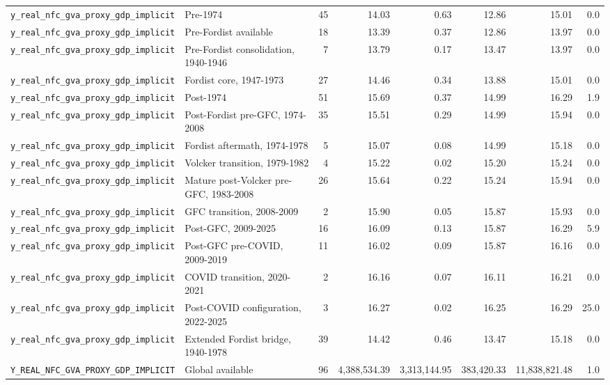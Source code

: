 \begin{landscape}
\begin{longtable}{p{4.4cm}p{3.8cm}rrrrrr}
\\
\nolinkurl{y_real_nfc_gva_proxy_gdp_implicit} & Pre-1974 & 45 & 14.03 & 0.63 & 12.86 & 15.01 & 0.0
\\
\nolinkurl{y_real_nfc_gva_proxy_gdp_implicit} & Pre-Fordist available & 18 & 13.39 & 0.37 & 12.86 & 13.97 & 0.0
\\
\nolinkurl{y_real_nfc_gva_proxy_gdp_implicit} & Pre-Fordist consolidation, 1940-1946 & 7 & 13.79 & 0.17 & 13.47 & 13.97 & 0.0
\\
\nolinkurl{y_real_nfc_gva_proxy_gdp_implicit} & Fordist core, 1947-1973 & 27 & 14.46 & 0.34 & 13.88 & 15.01 & 0.0
\\
\nolinkurl{y_real_nfc_gva_proxy_gdp_implicit} & Post-1974 & 51 & 15.69 & 0.37 & 14.99 & 16.29 & 1.9
\\
\nolinkurl{y_real_nfc_gva_proxy_gdp_implicit} & Post-Fordist pre-GFC, 1974-2008 & 35 & 15.51 & 0.29 & 14.99 & 15.94 & 0.0
\\
\nolinkurl{y_real_nfc_gva_proxy_gdp_implicit} & Fordist aftermath, 1974-1978 & 5 & 15.07 & 0.08 & 14.99 & 15.18 & 0.0
\\
\nolinkurl{y_real_nfc_gva_proxy_gdp_implicit} & Volcker transition, 1979-1982 & 4 & 15.22 & 0.02 & 15.20 & 15.24 & 0.0
\\
\nolinkurl{y_real_nfc_gva_proxy_gdp_implicit} & Mature post-Volcker pre-GFC, 1983-2008 & 26 & 15.64 & 0.22 & 15.24 & 15.94 & 0.0
\\
\nolinkurl{y_real_nfc_gva_proxy_gdp_implicit} & GFC transition, 2008-2009 & 2 & 15.90 & 0.05 & 15.87 & 15.93 & 0.0
\\
\nolinkurl{y_real_nfc_gva_proxy_gdp_implicit} & Post-GFC, 2009-2025 & 16 & 16.09 & 0.13 & 15.87 & 16.29 & 5.9
\\
\nolinkurl{y_real_nfc_gva_proxy_gdp_implicit} & Post-GFC pre-COVID, 2009-2019 & 11 & 16.02 & 0.09 & 15.87 & 16.16 & 0.0
\\
\nolinkurl{y_real_nfc_gva_proxy_gdp_implicit} & COVID transition, 2020-2021 & 2 & 16.16 & 0.07 & 16.11 & 16.21 & 0.0
\\
\nolinkurl{y_real_nfc_gva_proxy_gdp_implicit} & Post-COVID configuration, 2022-2025 & 3 & 16.27 & 0.02 & 16.25 & 16.29 & 25.0
\\
\nolinkurl{y_real_nfc_gva_proxy_gdp_implicit} & Extended Fordist bridge, 1940-1978 & 39 & 14.42 & 0.46 & 13.47 & 15.18 & 0.0
\\
\nolinkurl{Y_REAL_NFC_GVA_PROXY_GDP_IMPLICIT} & Global available & 96 & 4,388,534.39 & 3,313,144.95 & 383,420.33 & 11,838,821.48 & 1.0
\\

\end{longtable}
\end{landscape}

